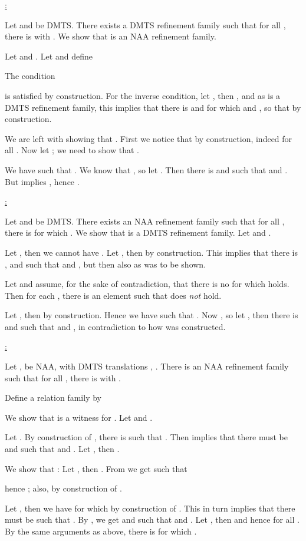\documentclass[twocolumn]{svjour3-dummy}
\newcommand*\NAA{NAA\xspace}
\begin{document}
  \noindent \underline{:}

  Let  and 
   be DMTS.  There exists a DMTS refinement family
   such that
  for all , there is  with .  We show that  is an \NAA
  refinement family.

  Let  and .  Let  and define
  
  The condition
  
  is satisfied by construction.  For the inverse condition, let , then , and as  is a DMTS
  refinement family, this implies that there is 
  and  for which  and , so that  by
  construction.

  We are left with showing that .  First we notice
  that by construction, indeed  for all .  Now let ; we need to show that .

  We have  such that .  We know that , so let .  Then there is  and  such that  and .  But  implies , hence .

  \medskip \noindent \underline{:}

  Let  and 
   be DMTS.  There exists an \NAA refinement family
   such that
  for all , there is  for which .  We show that  is
  a DMTS refinement family.  Let  and .

  Let , then we cannot have .
  Let , then
   by construction.  This implies that there is
  ,  and  such
  that  and , but then also  as was to be shown.

  Let  and assume, for the sake of contradiction, that
  there is no  for which  holds.  Then for each
  , there is an element 
  such that  does
  \emph{not} hold.

  Let , then  by construction.  Hence we have 
  such that .  Now , so let , then there is  and 
  such that  and , in contradiction to how  was
  constructed.

  \medskip \noindent \underline{:}

  Let ,  be
  \NAA, with DMTS translations 
  , .  There is
  an \NAA refinement family  such that for all , there is
   with .

  Define a relation family  by
  
  We show that  is a witness for .  Let  and
  .

  Let .  By construction of , there is  such that .  Then  implies that there must be
   and  such that  and .  Let
  , then .

  We show that : Let , then .  From  we get  such that
  
  hence ; also,  by
  construction of .

  Let , then we have  for which
   by construction of .  This in turn
  implies that there must be  such that .  By , we get  and  such that
   and .  Let , then
   and hence  for all .  By the same arguments as above, there is  for which .
\end{document}
